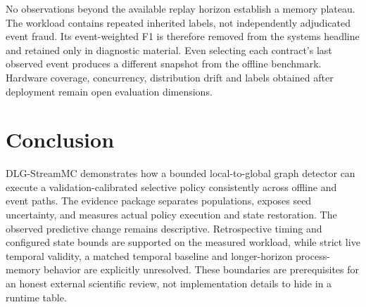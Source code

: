 \documentclass[10pt,journal]{IEEEtran}
\begin{document}
No observations beyond the available replay horizon establish a memory plateau. The workload contains repeated inherited labels, not independently adjudicated event fraud. Its event-weighted F1 is therefore removed from the systems headline and retained only in diagnostic material. Even selecting each contract's last observed event produces a different snapshot from the offline benchmark. Hardware coverage, concurrency, distribution drift and labels obtained after deployment remain open evaluation dimensions.

\section{Conclusion}
DLG-StreamMC demonstrates how a bounded local-to-global graph detector can execute a validation-calibrated selective policy consistently across offline and event paths. The evidence package separates populations, exposes seed uncertainty, and measures actual policy execution and state restoration. The observed predictive change remains descriptive. Retrospective timing and configured state bounds are supported on the measured workload, while strict live temporal validity, a matched temporal baseline and longer-horizon process-memory behavior are explicitly unresolved. These boundaries are prerequisites for an honest external scientific review, not implementation details to hide in a runtime table.


\end{document}
